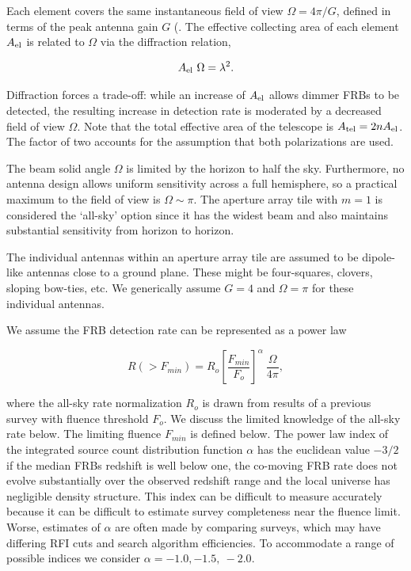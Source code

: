\documentclass[fleqn,usenatbib]{mnras}
\begin{document}
Each element covers the same instantaneous field of view $\Omega=4\pi/G$, defined in terms of the peak antenna gain $G$ (\cite{era}. The effective collecting area of each element $A_{\rm{el}}$ is related to $\Omega$ via the diffraction relation, 

\begin{equation}
		A_{\rm{el}} ~\Omega =\lambda^2.
\end{equation}

Diffraction forces a trade-off: while an increase of $A_{\rm{el}}$ allows dimmer FRBs to be detected, the resulting increase in detection rate is moderated by a decreased field of view $\Omega$. Note that the total effective area of the telescope is $ A_{\rm{tel}}= 2 n A_{\rm{el}}$. The factor of two accounts for the assumption that both polarizations are used.

The beam solid angle $\Omega$ is limited by the horizon to half the sky. Furthermore, no antenna design allows uniform sensitivity across a full hemisphere, so a practical maximum to the field of view is  $\Omega \sim \pi$. The aperture array tile with $m=1$ is considered the `all-sky' option since it has the widest beam and also maintains substantial sensitivity from horizon to horizon.

The individual antennas within an aperture array tile are assumed to be dipole-like antennas close to a ground plane. These might be four-squares, clovers, sloping bow-ties, etc.  We generically assume $G=4$ and $\Omega = \pi$ for these individual antennas.

We assume the FRB detection rate can be represented as a power law 

\begin{equation}
	R(>F_{min}) = R_o \left[ \frac{F_{min} }{F_o} \right] ^\alpha  ~\frac{\Omega}{4 \pi}, 
\end{equation}  

where the all-sky rate normalization $R_o$ is drawn from results of a previous survey with fluence threshold $F_o $. We discuss the limited knowledge of the all-sky rate below. The limiting fluence $F_{min}$ is defined below.
The power law index of the integrated source count distribution function $\alpha $ has the euclidean value $-3/2$ if the median FRBs  redshift is well below one, the co-moving FRB rate does not evolve substantially over the observed redshift range and the local universe has negligible density structure. This index can be difficult to measure accurately because it can be difficult to estimate survey completeness near the fluence limit. Worse, estimates of $\alpha$ are often made by comparing surveys, which may have differing RFI cuts and search algorithm efficiencies.  To accommodate a range of possible indices we consider $\alpha = -1.0, -1.5, ~-2.0$. 
\end{document}
